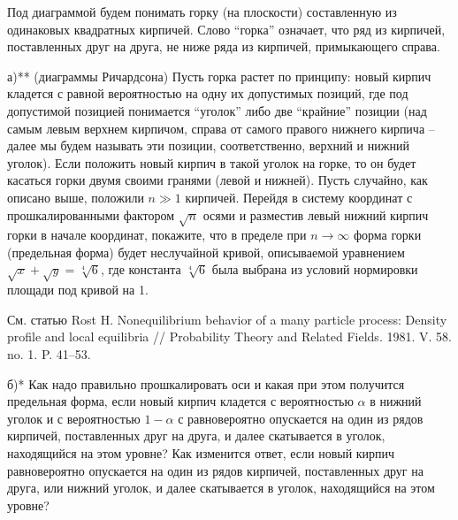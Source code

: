\begin{problem}  
Под диаграммой будем понимать горку (на плоскости) составленную из одинаковых 
квадратных кирпичей. Слово ``горка'' означает, что ряд из кирпичей, 
поставленных друг на друга, не ниже ряда из кирпичей, примыкающего справа. 

а)** (диаграммы Ричардсона) Пусть горка растет по принципу: новый 
кирпич кладется с равной вероятностью на одну их допустимых позиций, где под 
допустимой позицией понимается ``уголок'' либо две ``крайние'' позиции (над 
самым левым верхнем кирпичом, справа от самого правого нижнего кирпича -- 
далее мы будем называть эти позиции, соответственно, верхний и нижний 
уголок). Если положить новый кирпич в такой уголок на горке, то он будет 
касаться горки двумя своими гранями (левой и нижней). Пусть случайно, как 
описано выше, положили $n\gg 1$ кирпичей. Перейдя в систему координат с 
прошкалированными фактором $\sqrt n $ осями и разместив левый нижний кирпич 
горки в начале координат, покажите, что в пределе при $n\to \infty $ форма 
горки (предельная форма) будет неслучайной кривой, описываемой уравнением 
$\sqrt x +\sqrt y =\sqrt[4]{6}$, где константа $\sqrt[4]{6}$ была выбрана из 
условий нормировки площади под кривой на 1.

\begin{remark}
См. статью Rost H. Nonequilibrium behavior of a many particle 
process: Density profile and local equilibria // Probability Theory and 
Related Fields. 1981. V. 58. no. 1. P. 41--53.
\end{remark}

б)* Как надо правильно прошкалировать оси и какая при этом 
получится предельная форма, если новый кирпич кладется с вероятностью 
$\alpha $ в нижний уголок и с вероятностью $1-\alpha $ с равновероятно 
опускается на один из рядов кирпичей, поставленных друг на друга, и далее 
скатывается в уголок, находящийся на этом уровне? Как изменится ответ, если 
новый кирпич равновероятно опускается на один из рядов кирпичей, 
поставленных друг на друга, или нижний уголок, и далее скатывается в уголок, 
находящийся на этом уровне?


\end{problem}
